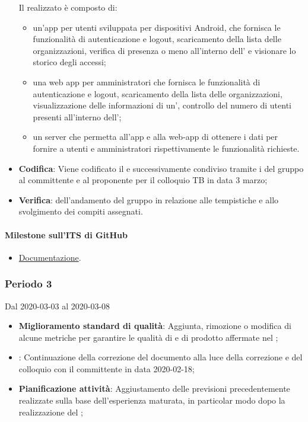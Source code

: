 \begin{itemize}
	Il  realizzato è composto di:
	\begin{itemize}
		\item un'app per utenti sviluppata per dispositivi Android, che fornisca le funzionalità di autenticazione e logout, scaricamento della lista delle organizzazioni, verifica di presenza o meno all'interno dell' e visionare lo storico degli accessi;
		\item una web app per amministratori che fornisca le funzionalità di autenticazione e logout, scaricamento della lista delle organizzazioni, visualizzazione delle informazioni di un', controllo del numero di utenti presenti all'interno dell';
		\item un server che permetta all'app e alla web-app di ottenere i dati per fornire a utenti e amministratori rispettivamente le funzionalità richieste.
	\end{itemize}
	\item \textbf{Codifica}: Viene codificato il  e successivamente condiviso tramite i  del gruppo al committente e al proponente per il colloquio TB in data 3 marzo;
	\item \textbf{Verifica}:  dell'andamento del gruppo in relazione alle tempistiche e allo svolgimento dei compiti assegnati.
\end{itemize}
\paragraph{Milestone sull'ITS di GitHub}
\begin{itemize}
	\item \href{https://github.com/qb-team/Stalker-Documentazione/milestone/9}{Documentazione}.
\end{itemize}

\subsubsection{Periodo 3} 
Dal 2020-03-03 al 2020-03-08
\begin{itemize}
	\item \textbf{Miglioramento standard di qualità}: Aggiunta, rimozione o modifica di alcune metriche per garantire le qualità di  e di prodotto affermate nel \PdQ{};
	\item \textbf{\AdR{}}: Continuazione della correzione del documento alla luce della correzione e del colloquio con il committente in data 2020-02-18;
	\item \textbf{Pianificazione attività}: Aggiustamento delle previsioni precedentemente realizzate sulla base dell'esperienza maturata, in particolar modo dopo la realizzazione del ;
\end{itemize}

